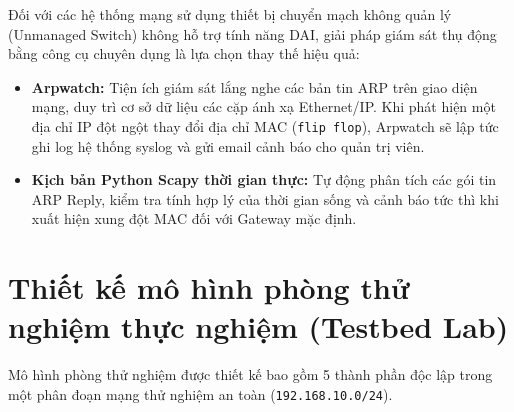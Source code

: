 Đối với các hệ thống mạng sử dụng thiết bị chuyển mạch không quản lý (Unmanaged Switch) không hỗ trợ tính năng DAI, giải pháp giám sát thụ động bằng công cụ chuyên dụng là lựa chọn thay thế hiệu quả:
\begin{itemize}
  \item \textbf{Arpwatch:} Tiện ích giám sát lắng nghe các bản tin ARP trên giao diện mạng, duy trì cơ sở dữ liệu các cặp ánh xạ Ethernet/IP. Khi phát hiện một địa chỉ IP đột ngột thay đổi địa chỉ MAC (\texttt{flip flop}), Arpwatch sẽ lập tức ghi log hệ thống syslog và gửi email cảnh báo cho quản trị viên.
  \item \textbf{Kịch bản Python Scapy thời gian thực:} Tự động phân tích các gói tin ARP Reply, kiểm tra tính hợp lý của thời gian sống và cảnh báo tức thì khi xuất hiện xung đột MAC đối với Gateway mặc định.
\end{itemize}

\section{Thiết kế mô hình phòng thử nghiệm thực nghiệm (Testbed Lab)}

Mô hình phòng thử nghiệm được thiết kế bao gồm 5 thành phần độc lập trong một phân đoạn mạng thử nghiệm an toàn (\texttt{192.168.10.0/24}).

